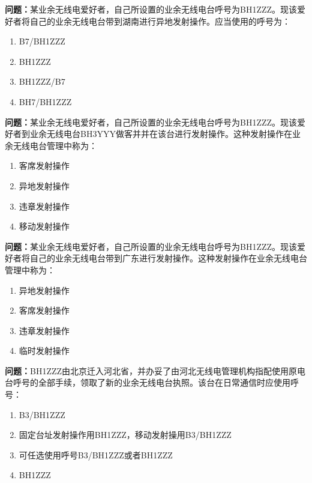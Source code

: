 \bigskip


\noindent\textbf{问题：}某业余无线电爱好者，自己所设置的业余无线电台呼号为BH1ZZZ。现该爱好者将自己的业余无线电台带到湖南进行异地发射操作。应当使用的呼号为：
\begin{enumerate}[label=\Alph*), leftmargin=3em]
\item B7/BH1ZZZ
\item BH1ZZZ
\item BH1ZZZ/B7
\item BH7/BH1ZZZ
\end{enumerate}

\bigskip


\noindent\textbf{问题：}某业余无线电爱好者，自己所设置的业余无线电台呼号为BH1ZZZ。现该爱好者到业余无线电台BH3YYY做客并并在该台进行发射操作。这种发射操作在业余无线电台管理中称为：
\begin{enumerate}[label=\Alph*), leftmargin=3em]
\item 客席发射操作
\item 异地发射操作
\item 违章发射操作
\item 移动发射操作
\end{enumerate}

\bigskip


\noindent\textbf{问题：}某业余无线电爱好者，自己所设置的业余无线电台呼号为BH1ZZZ。现该爱好者将自己的业余无线电台带到广东进行发射操作。这种发射操作在业余无线电台管理中称为：
\begin{enumerate}[label=\Alph*), leftmargin=3em]
\item 异地发射操作
\item 客席发射操作
\item 违章发射操作
\item 临时发射操作
\end{enumerate}

\bigskip


\noindent\textbf{问题：}BH1ZZZ由北京迁入河北省，并办妥了由河北无线电管理机构指配使用原电台呼号的全部手续，领取了新的业余无线电台执照。该台在日常通信时应使用呼号：
\begin{enumerate}[label=\Alph*), leftmargin=3em]
\item B3/BH1ZZZ
\item 固定台址发射操作用BH1ZZZ，移动发射操用B3/BH1ZZZ
\item 可任选使用呼号B3/BH1ZZZ或者BH1ZZZ
\item BH1ZZZ
\end{enumerate}

\bigskip


